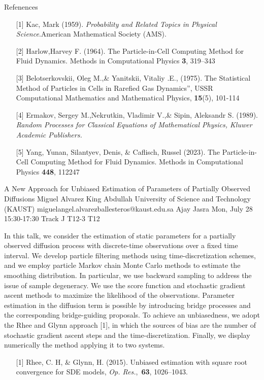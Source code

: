 \begin{talk}
Refenences
\begin{enumerate}
	\item[{[1]}] Kac, Mark (1959). {\it Probability and Related Topics in Physical Science}.American Mathematical Society (AMS).
	\item[{[2]}] Harlow,Harvey F.  (1964).   The Particle-in-Cell Computing Method for Fluid Dynamics. Methods in Computational Physics \textbf{3}, 319--343
\item[{[3]}] Belotserkovskii, Oleg M.,\& Yanitskii, Vitaliy .E.,   (1975).  The Statistical Method of Particles in Cells in Rarefied Gas Dynamics”, USSR Computational Mathematics and Mathematical Physics,  \textbf{15}(5), 101-114
\item[{[4]}] Ermakov, Sergey M.,Nekrutkin, Vladimir V.,\& Sipin, Aleksandr S.  (1989). {\it Random Processes for Classical Equations of Mathematical Physics, Kluwer Academic Publishers.}
\item[{[5]} ] Yang, Yunan, Silantyev, Denis, \&   Caflisch, Russel (2023).   The Particle-in-Cell Computing Method for Fluid Dynamics. Methods in Computational Physics \textbf{448}, 112247
\end{enumerate}

\end{talk}

\begin{talk}
  {A New Approach for Unbiased Estimation of Parameters of Partially Observed Diffusions}%
  {Miguel Alvarez}%
  {King Abdullah University of Science and Technology (KAUST)}%
  {miguelangel.alvarezballesteros@kaust.edu.sa}%
  {Ajay Jasra}%
  {}%
  {Mon, July 28 15:30-17:30 Track J}%
  {T12-3}%
  {T12}%
  
				
			
In this talk, we consider the estimation of static parameters for a partially observed diffusion process with discrete-time observations over a fixed time interval. We develop particle filtering methods using time-discretization schemes, and we employ particle Markov chain Monte Carlo methods to estimate the smoothing distribution. In particular, we use backward sampling to address the issue of sample degeneracy. We use the score function and stochastic gradient ascent methods to maximize the likelihood of the observations. Parameter estimation in the diffusion term is possible by introducing bridge processes and the corresponding bridge-guiding proposals. To achieve an unbiasedness, we adopt the Rhee and Glynn approach [1], in which the sources of bias are the number of stochastic gradient ascent steps and the time-discretization. Finally, we display numerically the method applying it to two systems. 

\medskip

\begin{enumerate}
	\item[{[1]}] Rhee, C. H, \& Glynn, H. (2015).  Unbiased estimation with square root convergence for SDE models, \emph{Op. Res.},~{\bf 63}, 1026--1043. 
\end{enumerate}

\end{talk}

